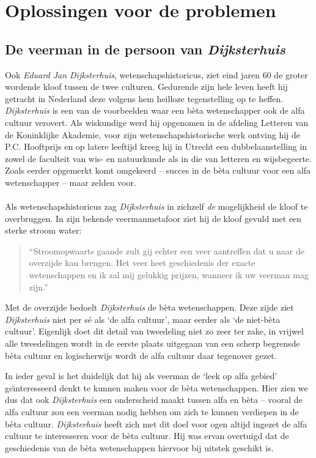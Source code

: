 \section{Oplossingen voor de problemen}


\subsection{De veerman in de persoon van \emph{Dijksterhuis}}

Ook \emph{Eduard Jan Dijksterhuis}, wetenschapshistoricus, ziet eind jaren 60 de groter wordende kloof tussen de twee culturen. Gedurende zijn hele leven heeft hij getracht in Nederland deze volgens hem heilloze tegenstelling op te heffen. \emph{Dijksterhuis} is een van de voorbeelden waar een b\`eta wetenschapper ook de alfa cultuur verovert. Als wiskundige werd hij opgenomen in de afdeling Letteren van de Koninklijke Akademie, voor zijn wetenschapshistorische werk ontving hij de P.C. Hooftprijs en op latere leeftijd kreeg hij in Utrecht een dubbelaanstelling in zowel de faculteit van wis- en natuurkunde als in die van letteren en wijsbegeerte. Zoals eerder opgemerkt komt omgekeerd -- succes in de b\`eta cultuur voor een alfa wetenschapper -- maar zelden voor.

\paragraph{}

Als wetenschapshistoricus zag \emph{Dijksterhuis} in zichzelf \emph{de} mogelijkheid de kloof te overbruggen. In zijn bekende veermanmetafoor ziet hij de kloof gevuld met een sterke stroom water:

\begin{quote}
``Stroomopwaarts gaande zult gij echter een veer aantreffen dat u naar de overzijde kan brengen. Het veer heet geschiedenis der exacte wetenschappen en ik zal mij gelukkig prijzen, wanneer ik uw veerman mag zijn.''
\end{quote}

Met de overzijde bedoelt \emph{Dijksterhuis} de b\`eta wetenschappen. Deze zijde ziet \emph{Dijksterhuis} niet per s\'e als `de alfa cultuur', maar eerder als `de niet-b\`eta cultuur'. Eigenlijk doet dit detail van tweedeling niet zo zeer ter zake, in vrijwel alle tweedelingen wordt in de eerste plaats uitgegaan van een scherp begrensde b\`eta cultuur en logischerwijs wordt de alfa cultuur daar tegenover gezet.

In ieder geval is het duidelijk dat hij als veerman de `leek op alfa gebied' ge\"\i{}nteresseerd denkt te kunnen maken voor de b\`eta wetenschappen. Hier zien we dus dat ook \emph{Dijksterhuis} een onderscheid maakt tussen alfa en b\`eta -- vooral de alfa cultuur zou een veerman nodig hebben om zich te kunnen verdiepen in de b\`eta cultuur. \emph{Dijksterhuis} heeft zich met dit doel voor ogen altijd ingezet de alfa cultuur te interesseren voor de b\`eta cultuur. Hij was ervan overtuigd dat de geschiedenis van de b\`eta wetenschappen hiervoor bij uitstek geschikt is.


